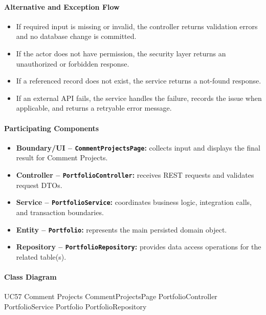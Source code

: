 \paragraph{Alternative and Exception Flow}

\begin{itemize}
    \item If required input is missing or invalid, the controller returns validation errors and no database change is committed.
    \item If the actor does not have permission, the security layer returns an unauthorized or forbidden response.
    \item If a referenced record does not exist, the service returns a not-found response.
    \item If an external API fails, the service handles the failure, records the issue when applicable, and returns a retryable error message.
\end{itemize}

\paragraph{Participating Components}

\begin{itemize}
    \item \textbf{Boundary/UI -- \texttt{CommentProjectsPage}:} collects input and displays the final result for Comment Projects.
    \item \textbf{Controller -- \texttt{PortfolioController}:} receives REST requests and validates request DTOs.
    \item \textbf{Service -- \texttt{PortfolioService}:} coordinates business logic, integration calls, and transaction boundaries.
    \item \textbf{Entity -- \texttt{Portfolio}:} represents the main persisted domain object.
    \item \textbf{Repository -- \texttt{PortfolioRepository}:} provides data access operations for the related table(s).
\end{itemize}

\paragraph{Class Diagram}

\ClassDiagram
{UC57 Comment Projects}
{CommentProjectsPage}
{PortfolioController}
{PortfolioService}
{Portfolio}
{PortfolioRepository}

